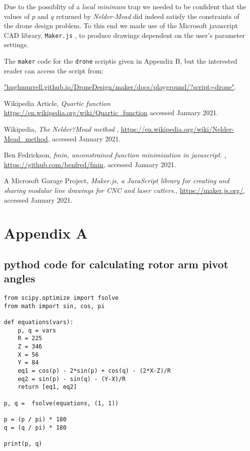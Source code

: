 \documentclass[11pt]{article}
\begin{document}
Due to the possiblity of a {\em local minimum} trap we needed to be confident that the
values of $p$ and $q$ returned by {\em Nelder-Mead} did indeed satisfy the constraints
of the drone design problem. To this end we made use of the Microsoft javascript CAD library,
{\tt Maker.js} \cite{maker}, to produce drawings dependent on the user's parameter settings. 

The {\tt maker} code for the {\tt drone} scriptis given in Appendix B, but the interested reader
can access the script from:

\small
\url{"hughmurrell.github.io/DroneDesign/maker/docs/playground/?script=drone"}.
\normalsize


\begin{thebibliography}{99}


 Wikipedia Article,
{\em Quartic function} 
\url{https://en.wikipedia.org/wiki/Quartic_function}
accessed January 2021.

 Wikipedia,
{\em The Nelder?Mead method },
\url{https://en.wikipedia.org/wiki/Nelder-Mead_method},
accessed January 2021.

 Ben Fedrickson,
{\em fmin, unconstrained function minimization in javascript.  },
\url{https://github.com/benfred/fmin},
accessed January 2021.

 A Microsoft Garage Project,
{\em Maker.js, a JavaScript library for creating and sharing modular line drawings for CNC and laser cutters.},
\url{https://maker.js.org/},
accessed January 2021.

\end{thebibliography}

\section*{Appendix A}
\subsection*{pythod code for calculating rotor arm pivot angles}

\tiny
\begin{lstlisting}
from scipy.optimize import fsolve
from math import sin, cos, pi

def equations(vars):
    p, q = vars
    R = 225
    Z = 346
    X = 56
    Y = 84
    eq1 = cos(p) - 2*sin(p) + cos(q) - (2*X-Z)/R
    eq2 = sin(p) - sin(q) - (Y-X)/R
    return [eq1, eq2]

p, q =  fsolve(equations, (1, 1))

p = (p / pi) * 180
q = (q / pi) * 180

print(p, q)
\end{lstlisting}
\end{document}

